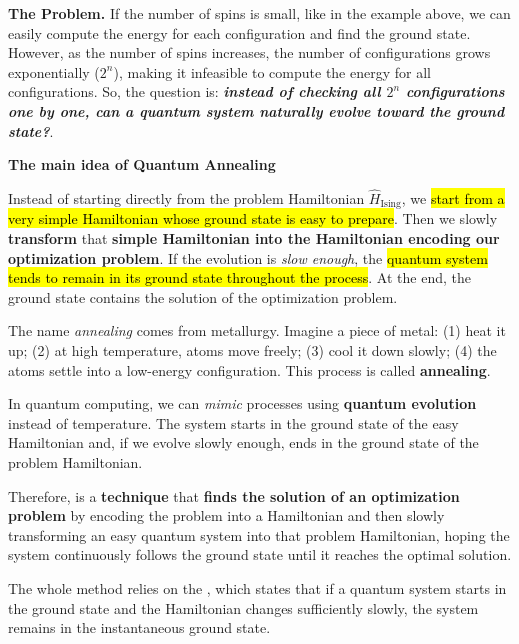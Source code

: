 \highspace
\textcolor{Red2}{ \textbf{The Problem.}} If the number of spins is small, like in the example above, we can easily compute the energy for each configuration and find the ground state. However, as the number of spins increases, the number of configurations grows exponentially ($2^n$), making it infeasible to compute the energy for all configurations. So, the question is: \textbf{\emph{instead of checking all $2^n$ configurations one by one, can a quantum system naturally evolve toward the ground state?}}.

\newpage

\begin{flushleft}
    \textcolor{Green3}{ \textbf{The main idea of Quantum Annealing}}
\end{flushleft}
Instead of starting directly from the problem Hamiltonian $\hat{H}_{\text{Ising}}$, we \hl{start from a very simple Hamiltonian whose ground state is easy to prepare}. Then we slowly \textbf{transform} that \textbf{simple Hamiltonian into the Hamiltonian encoding our optimization problem}. If the evolution is \emph{slow enough}, the \hl{quantum system tends to remain in its ground state throughout the process}. At the end, the ground state contains the solution of the optimization problem.

\highspace
\begin{definitionbox}
    The name \emph{annealing} comes from metallurgy. Imagine a piece of metal: (1) heat it up; (2) at high temperature, atoms move freely; (3) cool it down slowly; (4) the atoms settle into a low-energy configuration. This process is called \textbf{annealing}.

    \highspace
    In quantum computing, we can \emph{mimic} processes using \textbf{quantum evolution} instead of temperature. The system starts in the ground state of the easy Hamiltonian and, if we evolve slowly enough, ends in the ground state of the problem Hamiltonian.

    \highspace
    Therefore,  is a \textbf{technique} that \textbf{finds the solution of an optimization problem} by encoding the problem into a Hamiltonian and then slowly transforming an easy quantum system into that problem Hamiltonian, hoping the system continuously follows the ground state until it reaches the optimal solution.

    \highspace
    The whole method relies on the , which states that if a quantum system starts in the ground state and the Hamiltonian changes sufficiently slowly, the system remains in the instantaneous ground state.
\end{definitionbox}

